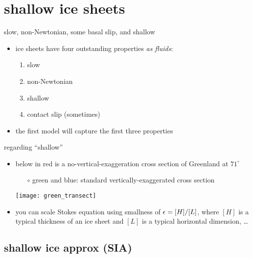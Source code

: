 
\section{shallow ice sheets}

\begin{frame}{slow, non-Newtonian, some basal slip, and shallow}

\begin{itemize}
\item ice sheets have four outstanding properties \emph{as fluids}:
  \begin{enumerate}
  \item slow
  \item non-Newtonian
  \item shallow
  \item contact slip (sometimes)
  \end{enumerate}

\vspace{5mm}
\item the first model will capture the first three properties
\end{itemize}
\end{frame}


\begin{frame}{regarding ``shallow''}

\begin{itemize}
\item below in \alert{red} is a no-vertical-exaggeration cross section of Greenland at $71^\circ$
\small
  \begin{itemize}
  \item[$\circ$] green and blue: standard vertically-exaggerated cross section
  \end{itemize}
  \begin{center}
    \texttt{[image: green\_transect]}
  \end{center}
\item you can scale Stokes equation using smallness of $\epsilon = [H]/[L]$, where $[H]$ is a typical thickness of an ice sheet and $[L]$ is a typical horizontal dimension, \dots
\end{itemize}
\end{frame}


\subsection{shallow ice approx (SIA)}


